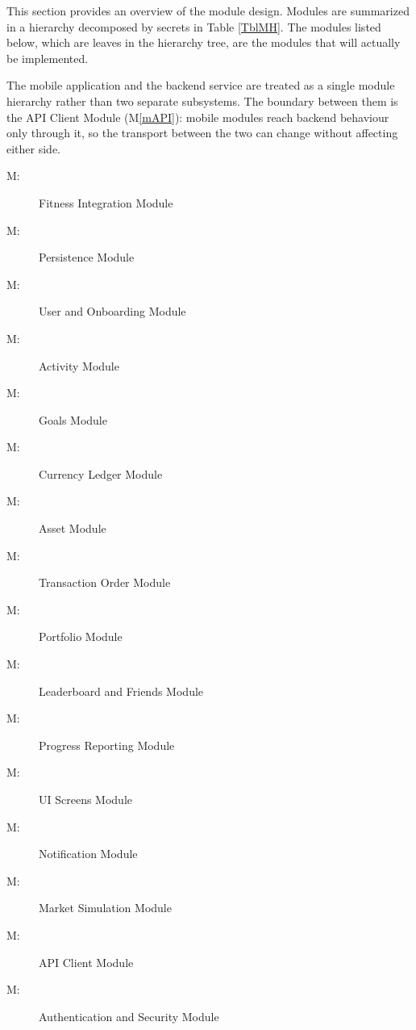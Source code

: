 \documentclass[12pt, titlepage]{article}
\newcounter{mnum}
\newcommand{\mthemnum}{M\themnum}
\newcommand{\mref}[1]{M\ref{#1}}
\begin{document}
This section provides an overview of the module design. Modules are summarized
in a hierarchy decomposed by secrets in Table \ref{TblMH}. The modules listed
below, which are leaves in the hierarchy tree, are the modules that will
actually be implemented.

The mobile application and the backend service are treated as a single module
hierarchy rather than two separate subsystems. The boundary between them is the
API Client Module (\mref{mAPI}): mobile modules reach backend behaviour only
through it, so the transport between the two can change without affecting
either side.

\begin{description}
\item [ \mthemnum \label{mFI}:] Fitness Integration Module
\item [ \mthemnum \label{mPer}:] Persistence Module
\item [ \mthemnum \label{mUser}:] User and Onboarding Module
\item [ \mthemnum \label{mAct}:] Activity Module
\item [ \mthemnum \label{mGoal}:] Goals Module
\item [ \mthemnum \label{mCur}:] Currency Ledger Module
\item [ \mthemnum \label{mAsset}:] Asset Module
\item [ \mthemnum \label{mPurch}:] Transaction Order Module
\item [ \mthemnum \label{mPort}:] Portfolio Module
\item [ \mthemnum \label{mLead}:] Leaderboard and Friends Module
\item [ \mthemnum \label{mProg}:] Progress Reporting Module
\item [ \mthemnum \label{mUI}:] UI Screens Module
\item [ \mthemnum \label{mNoti}:] Notification Module
\item [ \mthemnum \label{mMkt}:] Market Simulation Module
\item [ \mthemnum \label{mAPI}:] API Client Module
\item [ \mthemnum \label{mAuth}:] Authentication and Security Module
\end{description}
\end{document}
